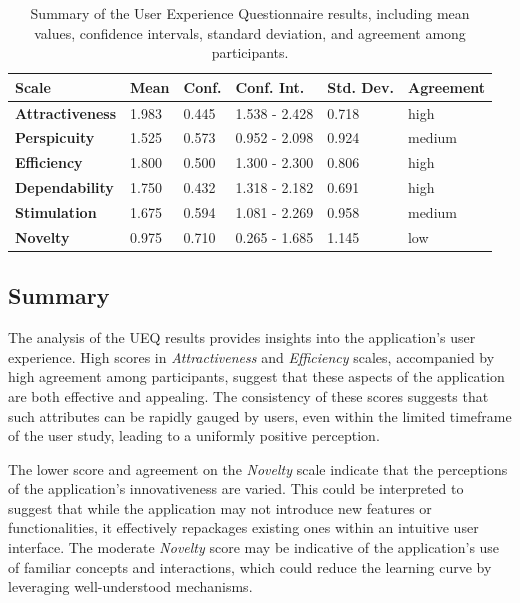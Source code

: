 \begin{table}[htb]
  \centering
  \begin{tabularx}{\textwidth}{|X|l|l|l|l|l|}
  \hline
      \textbf{Scale} &  \textbf{Mean}  &  \textbf{Conf.} &  \textbf{Conf. Int.} &  \textbf{Std. Dev.} & \textbf{Agreement}\\ \hline
      \textbf{Attractiveness} & 1.983  & 0.445 & 1.538 - 2.428 & 0.718 & high \\ \hline
      \textbf{Perspicuity} & 1.525 & 0.573 & 0.952 - 2.098 & 0.924 & medium\\ \hline
      \textbf{Efficiency} & 1.800 & 0.500 & 1.300 - 2.300 & 0.806 & high \\ \hline
      \textbf{Dependability} & 1.750 & 0.432 & 1.318 - 2.182 & 0.691 & high \\ \hline
      \textbf{Stimulation} & 1.675 & 0.594 & 1.081 - 2.269 & 0.958 & medium \\ \hline
      \textbf{Novelty} & 0.975 & 0.710 & 0.265 - 1.685 & 1.145 & low \\ \hline
  \end{tabularx}
  \vspace{6pt}
  \caption{Summary of the User Experience Questionnaire results, including mean values, confidence intervals, standard deviation, and agreement among participants.}
  \label{tab:ueq-summary}
\end{table}

\subsection*{Summary}

The analysis of the UEQ results provides insights into the application's user experience.
High scores in \emph{Attractiveness} and \emph{Efficiency} scales, accompanied by high agreement among participants, suggest that these aspects of the application are both effective and appealing.
The consistency of these scores suggests that such attributes can be rapidly gauged by users, even within the limited timeframe of the user study, leading to a uniformly positive perception.

The lower score and agreement on the \emph{Novelty} scale indicate that the perceptions of the application's innovativeness are varied.
This could be interpreted to suggest that while the application may not introduce new features or functionalities, it effectively repackages existing ones within an intuitive user interface.
The moderate \emph{Novelty} score may be indicative of the application's use of familiar concepts and interactions, which could reduce the learning curve by leveraging well-understood mechanisms.


